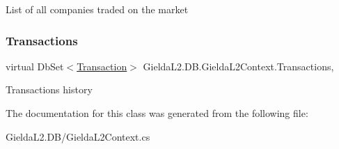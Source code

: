 List of all companies traded on the market 

\mbox{\label{class_gielda_l2_1_1_d_b_1_1_gielda_l2_context_a809df5e666f7fdb0cc6e53adad91efe8}} 
\subsubsection{\texorpdfstring{Transactions}{Transactions}}
{\footnotesize\ttfamily virtual Db\+Set$<$\mbox{\hyperlink{class_gielda_l2_1_1_d_b_1_1_entities_1_1_transaction}{Transaction}}$>$ Gielda\+L2.\+D\+B.\+Gielda\+L2\+Context.\+Transactions\hspace{0.3cm}{\ttfamily [get]}, {\ttfamily [set]}}



Transactions history 



The documentation for this class was generated from the following file\+:\begin{DoxyCompactItemize}
\item 
Gielda\+L2.\+D\+B/Gielda\+L2\+Context.\+cs\end{DoxyCompactItemize}
